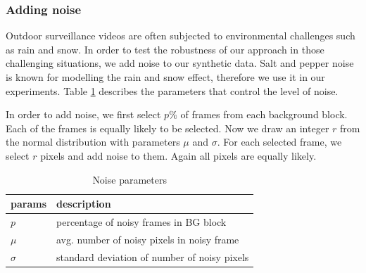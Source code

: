 \subsubsection{Adding noise}
Outdoor surveillance videos are often subjected to environmental challenges such as rain and snow. In order to test the robustness of our approach in those challenging situations, we add noise to our synthetic data. Salt and pepper noise \cite{marques2011practical} is known for modelling the rain and snow effect, therefore we use it in our experiments. 
Table \ref{table:noise-params} describes the parameters that control the level of noise. 

In order to add noise, we first select $p\%$ of frames from each background block. Each of the frames is equally likely to be selected. Now we draw an integer $r$ from the normal distribution with parameters $\mu$ and $\sigma$. For each selected frame, we select $r$ pixels and add noise to them. Again all pixels are equally likely. 

\begin{table}
\centering
\caption{Noise parameters}  \vspace{5pt}
\label{table:noise-params}
\begin{tabular}{|l|l|}
\hline
params & description                              \\ \hline \hline
$p$          & percentage of noisy frames in BG block  \\ 
$\mu$        & avg. number of noisy pixels in noisy frame     \\ 
$\sigma$     & standard deviation of number of noisy pixels     \\ \hline
\end{tabular}
\end{table}
